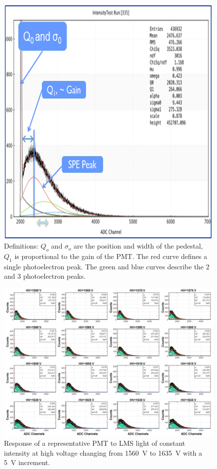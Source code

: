 \begin{figure}[!h]
    \centering
    \includegraphics[width=1.0\linewidth,trim={0.0cm 0.0cm 0.0cm 0.0cm},clip]{images/WILLIAM_1.png}
    \caption{Definitions: $Q_o$ and $\sigma_o$ are the position and width of the pedestal, $Q_ 1$ is proportional
      to the gain of the PMT. The red curve defines a single photoelectron peak. The green and blue curves describe
      the 2 and 3 photoelectron peaks.}
    \label{fig:WILLIAM_1}
\end{figure}

\begin{figure}[ht]
\centering
\includegraphics[width=0.99\linewidth]{images/WILLIAM_2_NEW.png}
\caption{Response of a representative PMT to LMS light of constant intensity at high voltage changing from 1560~V
  to 1635~V with a 5~V increment.}
\label{fig:WILLIAM_2_NEW}
\end{figure}

